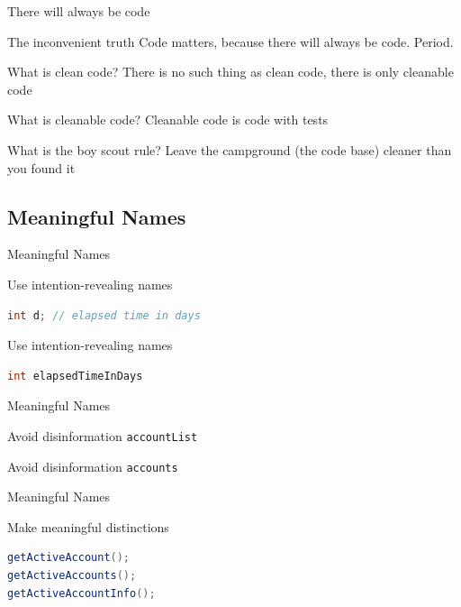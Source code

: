 \begin{frame}{There will always be code}
\begin{block}{The inconvenient truth}
Code matters, because there will always be code. Period.
\end{block}
\pause
\begin{block}{What is clean code?}
\pause
There is no such thing as clean code, there is only cleanable code
\end{block}
\pause
\begin{block}{What is cleanable code?}
Cleanable code is code with tests
\end{block}
\pause
\begin{block}{What is the boy scout rule?}
Leave the campground (the code base) cleaner than you found it
\end{block}
\end{frame}

\subsection{Meaningful Names}
\begin{frame}[fragile]{Meaningful Names}
\begin{alertblock}{Use intention-revealing names}
\begin{lstlisting}[language=java]
int d; // elapsed time in days
\end{lstlisting}
\end{alertblock}
\begin{exampleblock}{Use intention-revealing names}
\begin{lstlisting}[language=java]
int elapsedTimeInDays
\end{lstlisting}
\end{exampleblock}
\end{frame}

\begin{frame}[fragile]{Meaningful Names}
\begin{alertblock}{Avoid disinformation}
\lstinline!accountList!
\end{alertblock}
\begin{exampleblock}{Avoid disinformation}
\lstinline!accounts!
\end{exampleblock}
\end{frame}

\begin{frame}[fragile]{Meaningful Names}
\begin{alertblock}{Make meaningful distinctions}
\begin{lstlisting}[language=java]
getActiveAccount();
getActiveAccounts();
getActiveAccountInfo();
\end{lstlisting}
\end{alertblock}
\end{frame}

